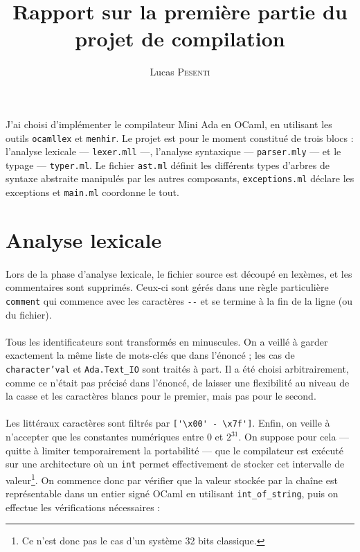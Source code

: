 \documentclass[a4paper,12pt]{article}
\title{Rapport sur la première partie du projet de compilation}
\author{Lucas \textsc{Pesenti}}
\date{}
\begin{document}
\maketitle
\paragraph*{}
J'ai choisi d'implémenter le compilateur Mini Ada en OCaml, en utilisant les
outils \texttt{ocamllex} et \texttt{menhir}. Le projet est pour le moment constitué de trois blocs : l'analyse lexicale --- \texttt{lexer.mll} ---, l'analyse syntaxique --- \texttt{parser.mly} --- et le typage --- \texttt{typer.ml}. Le fichier \texttt{ast.ml} définit les différents types d'arbres de syntaxe abstraite manipulés par les autres composants, \texttt{exceptions.ml} déclare les exceptions et \texttt{main.ml} coordonne le tout.

\section{Analyse lexicale}

\paragraph*{}
Lors de la phase d'analyse lexicale, le fichier source est découpé en lexèmes, et les commentaires sont supprimés. Ceux-ci sont gérés dans une règle particulière \texttt{comment} qui commence avec les caractères \texttt{-{}-} et se termine à la fin de la ligne (ou du fichier).

\paragraph*{}
Tous les identificateurs sont transformés en minuscules. On a veillé à garder exactement la même liste de mots-clés que dans l'énoncé ; les cas de \texttt{character'val} et \texttt{Ada.Text\_IO} sont traités à part. Il a été choisi arbitrairement, comme ce n'était pas précisé dans l'énoncé, de laisser une flexibilité au niveau de la casse et les caractères blancs pour le premier, mais pas pour le second.


\paragraph*{}
Les littéraux caractères sont filtrés par \verb$['\x00' - \x7f']$. Enfin, on veille à n'accepter que les constantes numériques entre $0$ et $2^{31}$. On suppose pour cela --- quitte à limiter temporairement la portabilité --- que le compilateur est exécuté sur une architecture où un \texttt{int} permet effectivement de stocker cet intervalle de valeur\footnote{Ce n'est donc pas le cas d'un système 32 bits classique.}. On commence donc par vérifier que la valeur stockée par la chaîne est représentable dans un entier signé OCaml en utilisant  \texttt{int\_of\_string}, puis on effectue les vérifications nécessaires : 
\end{document}
